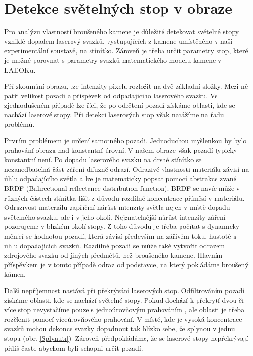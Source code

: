 \section*{Detekce světelných stop v obraze}
Pro analýzu vlastností broušeného kamene je důležité detekovat světelné stopy vzniklé dopadem laserový svazků, vystupujících z kamene umístěného v naší experimentální soustavě, na stínítko. Zároveň je třeba určit parametry stop, které je možné porovnat s parametry svazků matematického modelu kamene v LADOKu. 

Pří zkoumání obrazu, lze intenzity pixelu rozložit na dvě základní složky. Mezi ně patří velikost pozadí a příspěvek od odpadajícího laserového svazku. Ve zjednodušeném případě lze říci, že po odečtení pozadí získáme oblasti, kde se nachází laserové stopy. Při detekci laserových stop však narážíme na řadu problémů.

Prvním problémem je určení samotného pozadí. Jednoduchou myšlenkou by bylo prahování obrazu nad konstantní úrovní. V našem obraze však pozadí typicky konstantní není. Po dopadu laserového svazku na drsné stínítko se nezanedbatelná část záření difuzně odrazí. Odrazivé vlastnosti materiálu závisí na úhlu odpadajícího světla a lze je matematicky popsat pomocí abstrakce zvané BRDF (Bidirectional reflectance distribution function). BRDF se navíc může v různých částech stínítka lišit z důvodu rozdílné koncentrace příměsí v materiálu. Odrazivost materiálu zapříčiní nárůst intenzity světla nejen v místě dopadu světelného svazku, ale i v jeho okolí. Nejznatelnější nárůst intenzity záření pozorujeme v blízkém okolí stopy. Z toho důvodu je třeba počítat s dynamicky měnící se hodnotou pozadí, která závisí především na zářivém toku, hustotě a úhlu dopadajících svazků. Rozdílné pozadí se může také vytvořit odrazem zdrojového svazku od jiných předmětů, než broušeného kamene. Hlavním příspěvkem je v tomto případě odraz od podstavce, na který pokládáme broušený kámen.

Další nepříjemnost nastává při překrývání laserových stop. Odfiltrováním pozadí získáme oblasti, kde se nachází světelné stopy. Pokud dochází k překrytí dvou či více stop nevystačíme pouze s jednoúrovňovým prahováním \cite{Drapela}, ale oblasti je třeba rozčlenit pomocí víceúrovňového prahování. V místě, kde je vysoká koncentrace svazků mohou dokonce svazky dopadnout tak blízko sebe, že splynou v jednu stopu (obr. \ref{Splynuti}). Zároveň předpokládáme, že se laserové stopy nepřekrývají příliš často abychom byli schopni určit pozadí.   

